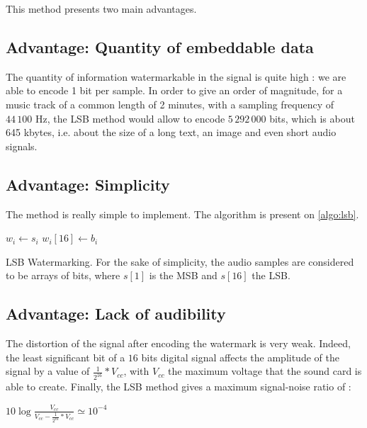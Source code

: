 This method presents two main advantages. 
\subsection{Advantage: Quantity of embeddable data}
The quantity of information watermarkable in the signal is quite high : we are able to encode 1 bit per sample. In order to give an order of magnitude, for a music track of a common length of 2 minutes, with a sampling frequency of $44\,100$ Hz, the \ac{LSB} method would allow to encode $5\,292\,000$ bits, which is about 645 kbytes, i.e. about the size of a long text, an image and even short audio signals. 
\subsection{Advantage: Simplicity}
The method is really simple to implement.
The algorithm is present on \ref{algo:lsb}.

\begin{algorithm}
\DontPrintSemicolon
{}

 {

  $w_i \gets s_i$ \;  
  $w_i [16] \gets b_i$ \;

}

\;

\caption{\ac{LSB} Watermarking. For the sake of simplicity, the audio samples are considered to be arrays of bits, where $s[1]$ is the \ac{MSB} and $s[16]$ the \ac{LSB}.}

\label{algo:lsb}

\end{algorithm}

\subsection{Advantage: Lack of audibility}
The distortion of the signal after encoding the watermark is very weak. Indeed, the least significant bit of a $16$ bits digital signal affects the amplitude of the signal by a value of $\displaystyle\frac{1}{2^{16}} * V_{cc}$\cite{kester2005data}, with $V_{cc}$ the maximum voltage that the sound card is able to create.
Finally, the LSB method gives a maximum signal-noise ratio of : 
 
\begin{center}
\begin{math}
10 \log \displaystyle\frac{V_{cc}}{V_{cc} - \displaystyle\frac{1}{2^{16}} * V_{cc}} \simeq 10^{-4}
\end{math}
\end{center}

